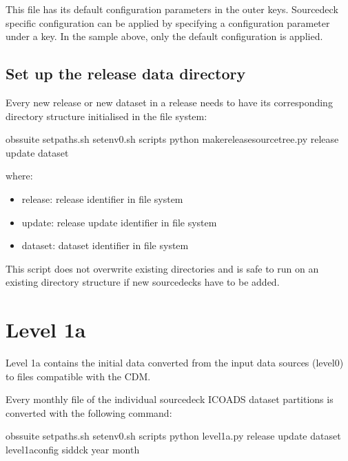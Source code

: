 \documentclass[letterpaper,10pt,english]{sphinxmanual}
\begin{document}
This file has its default configuration parameters in the outer keys.
Source\sphinxhyphen{}deck specific configuration can be applied by specifying a configuration
parameter under a  key. In the sample above, only the default
configuration is applied.


\section{Set up the release data directory}
\label{\detokenize{index:set-up-the-release-data-directory}}
Every new release or new dataset in a release needs to have its corresponding
directory structure initialised in the file system:

\begin{sphinxVerbatim}[commandchars=\\\{\}]
 obs\PYGZhy{}suite
 setpaths.sh
 setenv0.sh
 scripts
python make\PYGZus{}release\PYGZus{}source\PYGZus{}tree.py   release update dataset
\end{sphinxVerbatim}

where:
\begin{itemize}
\item {} 
release: release identifier in file system

\item {} 
update: release update identifier in file system

\item {} 
dataset: dataset identifier in file system

\end{itemize}

This script does not overwrite existing directories and is safe to run on an
existing directory structure if new source\sphinxhyphen{}decks have to be added.


\chapter{Level 1a}
\label{\detokenize{index:level-1a}}
Level 1a contains the initial data converted from the input data sources
(level0) to files compatible with the CDM.

Every monthly file of the individual source\sphinxhyphen{}deck ICOADS dataset partitions is
converted with the following command:

\begin{sphinxVerbatim}[commandchars=\\\{\}]
 obs\PYGZhy{}suite
 setpaths.sh
 setenv0.sh
 scripts
python level1a.py  release update dataset level1a\PYGZus{}config sid\PYGZhy{}dck year month
\end{sphinxVerbatim}
\end{document}
